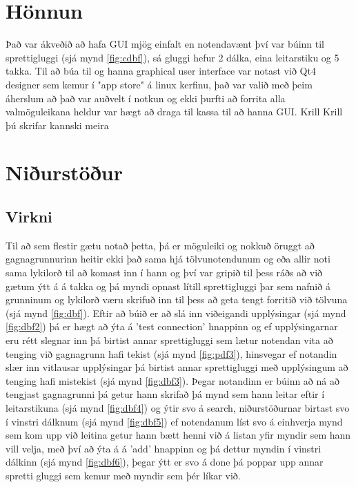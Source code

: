 \documentclass[12pt, git, final]{rureport}
\begin{document}
\section{Hönnun}
Það var ákveðið að hafa GUI mjög einfalt en notendavænt því var búinn til sprettigluggi (sjá mynd \ref{fig:cdbf}), sá gluggi hefur 2 dálka, eina leitarstiku og 5 takka. Til að búa til og hanna graphical user interface var notast við Qt4 designer sem kemur í "app store" á linux kerfinu, það var valið með þeim áherslum að það var auðvelt í notkun og ekki þurfti að forrita alla valmöguleikana heldur var hægt að draga til kassa til að hanna GUI. Krill Krill þú skrifar kannski meira 

\section{Niðurstöður}\label{nidurstodur}
\subsection {Virkni}
Til að sem flestir gætu notað þetta, þá er möguleiki og nokkuð öruggt að gagnagrunnurinn heitir ekki það sama hjá tölvunotendunum og eða allir noti sama lykilorð til að komast inn í hann og því var gripið til þess ráðs að við gætum ýtt á á takka og þá myndi opnast lítill sprettigluggi þar sem nafnið á grunninum og lykilorð væru skrifuð inn til þess að geta tengt forritið við tölvuna (sjá mynd \ref{fig:dbf}).
Eftir að búið er að slá inn viðeigandi upplýsingar (sjá mynd \ref{fig:dbf2}) þá er hægt að ýta á 'test connection' hnappinn og ef upplýsingarnar eru rétt slegnar inn þá birtist annar sprettigluggi sem lætur notendan vita að tenging við gagnagrunn hafi tekist (sjá mynd \ref{fig:pdf3}), hinsvegar ef notandin slær inn vitlausar upplýsingar þá birtist annar sprettigluggi með upplýsingum að tenging hafi mistekist (sjá mynd \ref {fig:dbf3}).
\newline
\newline
Þegar notandinn er búinn að ná að tengjast gagnagrunni þá getur hann skrifað þá mynd sem hann leitar eftir í leitarstikuna (sjá mynd \ref{fig:dbf4}) og ýtir svo á search, niðurstöðurnar birtast svo í vinstri dálknum (sjá mynd \ref{fig:dbf5}) ef notendanum líst svo á einhverja mynd sem kom upp við leitina  getur hann bætt henni við á listan yfir myndir sem hann vill velja, með því að ýta á á 'add' hnappinn og þá dettur myndin í vinstri dálkinn (sjá mynd \ref{fig:dbf6}), þegar ýtt er svo á done þá poppar upp annar spretti gluggi sem kemur með myndir sem þér líkar við. 
\end{document}
